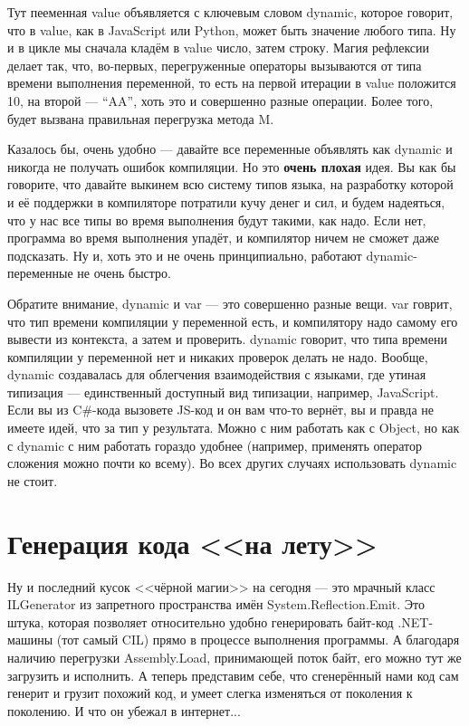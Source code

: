 \documentclass{../../text-style}
\begin{document}
Тут пееменная value объявляется с ключевым словом dynamic, которое говорит, что в value, как в JavaScript или Python, может быть значение любого типа. Ну и в цикле мы сначала кладём в value число, затем строку. Магия рефлексии делает так, что, во-первых, перегруженные операторы вызываются от типа времени выполнения переменной, то есть на первой итерации в value положится 10, на второй --- ``AA'', хоть это и совершенно разные операции. Более того, будет вызвана правильная перегрузка метода M.

Казалось бы, очень удобно --- давайте все переменные объявлять как dynamic и никогда не получать ошибок компиляции. Но это \textbf{очень плохая} идея. Вы как бы говорите, что давайте выкинем всю систему типов языка, на разработку которой и её поддержки в компиляторе потратили кучу денег и сил, и будем надеяться, что у нас все типы во время выполнения будут такими, как надо. Если нет, программа во время выполнения упадёт, и компилятор ничем не сможет даже подсказать. Ну и, хоть это и не очень принципиально, работают dynamic-переменные не очень быстро.

Обратите внимание, dynamic и var --- это совершенно разные вещи. var говрит, что тип времени компиляции у переменной есть, и компилятору надо самому его вывести из контекста, а затем и проверить. dynamic говорит, что типа времени компиляции у переменной нет и никаких проверок делать не надо. Вообще, dynamic создавалась для облегчения взаимодействия с языками, где утиная типизация --- единственный доступный вид типизации, например, JavaScript. Если вы из C\#-кода вызовете JS-код и он вам что-то вернёт, вы и правда не имеете идей, что за тип у результата. Можно с ним работать как с Object, но как с dynamic с ним работать гораздо удобнее (например, применять оператор сложения можно почти ко всему). Во всех других случаях использовать dynamic не стоит.

\section{Генерация кода <<на лету>>}

Ну и последний кусок <<чёрной магии>> на сегодня --- это мрачный класс ILGenerator из запретного пространства имён System.Reflection.Emit. Это штука, которая позволяет относительно удобно генерировать байт-код .NET-машины (тот самый CIL) прямо в процессе выполнения программы. А благодаря наличию перегрузки Assembly.Load, принимающей поток байт, его можно тут же загрузить и исполнить. А теперь представим себе, что сгенерённый нами код сам генерит и грузит похожий код, и умеет слегка изменяться от поколения к поколению. И что он убежал в интернет...
\end{document}

